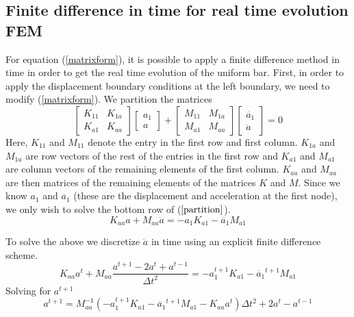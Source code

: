 \documentclass{article}
\begin{document}
\subsection{Finite difference in time for real time evolution FEM}
For equation (\ref{matrixform}), it is possible to apply a finite difference 
method in time in order to get the real time evolution of the uniform bar. 
First, in order to apply the displacement boundary conditions at the left 
boundary, we need to modify (\ref{matrixform}). We partition the matrices 
\begin{equation} \label{partition}
\begin{bmatrix}
K_{11} & K_{1a} \\
K_{a1} & K_{aa}
\end{bmatrix}
\begin{bmatrix}
a_1 \\
a
\end{bmatrix}
+
\begin{bmatrix}
M_{11} & M_{1a} \\
M_{a1} & M_{aa}
\end{bmatrix}
\begin{bmatrix}
\ddot{a_1} \\
\ddot{a}
\end{bmatrix}
= 0
\end{equation}
Here, $K_{11}$ and $M_{11}$ denote the entry in the first row and first column. 
$K_{1a}$ and $M_{1a}$ are row vectors of the rest of the entries in the first 
row and $K_{a1}$ and $M_{a1}$ are column vectors of the remaining elements of 
the first column. $K_{aa}$ and $M_{aa}$ are then matrices of the remaining 
elements of the matrices $K$ and $M$. Since we know $a_1$ and $\ddot{a_1}$ 
(these are the displacement and acceleration at the first node), we only wish 
to solve the bottom row of ($\ref{partition}$).
\begin{equation}
K_{aa}a + M_{aa}\ddot{a} = -a_1K_{a1} - \ddot{a_1}M_{a1}
\end{equation}

To solve the above we discretize $\ddot{a}$ in time using an explicit finite 
difference scheme.
\begin{equation}
K_{aa}a^t + M_{aa}\frac{a^{t+1} - 2a^t + a^{t-1}}{\Delta t^2 } = 
-a_1^{t+1}K_{a1} - \ddot{a_1}^{t+1}M_{a1}
\end{equation}
Solving for $a^{t+1}$
\begin{equation}
a^{t+1} = M_{aa}^{-1}(-a_1^{t+1}K_{a1} - \ddot{a_1}^{t+1}M_{a1} - 
K_{aa}a^t)\Delta t^2 
+ 2a^t - a^{t-1}
\end{equation}

{}

\end{document}
